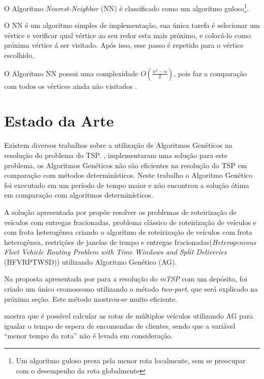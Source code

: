 \documentclass[12pt,openright,a4paper,oneside]{tcc}
\begin{document}
            O Algoritmo \textit{Nearest-Neighbor} (NN) é classificado como um algoritmo guloso\footnote{Um algoritmo guloso preza pela menor rota localmente, sem se preocupar com o desempenho da rota globalmente}.

            O NN é um algoritmo simples de implementação, sua única tarefa é selecionar um vértice e verificar qual vértice ao seu redor esta mais próximo, e colocá-lo como próxima vértice á ser visitado. Após isso, esse passo é repetido para o vértice escolhido. 

            O Algoritmo NN possui uma complexidade $O(\frac{n^2-n}{2})$, pois faz a comparação com todos os vértices ainda não visitados \cite{NN}.
			
		\chapter{Estado da Arte}
		
			Existem diversos trabalhos sobre a utilização de Algoritmos Genéticos na resolução do problema do TSP. , implementaram uma solução para este problema, os Algoritmos Genéticos não são eficientes 
			na resolução do TSP em comparação com métodos determinísticos. Neste trabalho o Algoritmo Genético foi executado em um período de tempo maior e não encontrou a solução ótima em comparação com algoritmos determinísticos.

			A solução apresentada por  propõe resolver os problemas de roteirização de 
			veículos com entregas fracionadas, problema clássico de roteirização de veículos e com 
			frota heterogênea criando o algoritmo de roteirização de veículos com frota heterogênea, 
			restrições de janelas de tempo e entregas fracionadas(\textit{Heterogeneous Fleet Vehicle 
			Routing Problem with Time Windows and Split Deliveries} (HFVRPTWSD)) utilizando Algoritmo 
			Genético (AG).

			Na proposta  apresentada por  para a resolução do \textit{mTSP} com um depósito, foi criado um único cromossomo utilizando o método \textit{two-part}, que será explicado na próxima seção. Este método mostrou-se muito eficiente.

			  mostra que é possível calcular as rotas de múltiplos veículos utilizando AG para igualar o tempo 
			de espera de encomendas de clientes, sendo que a variável ``menor tempo da rota'' não é levada em consideração.

		
	
\end{document}

